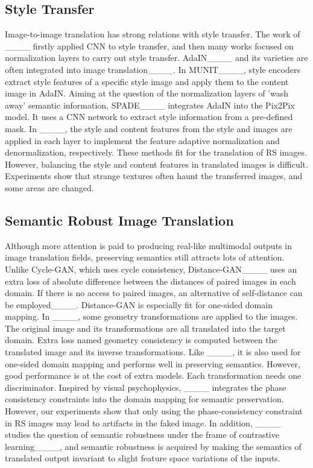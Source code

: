 \subsection{Style Transfer}\label{sec2.3}
Image-to-image translation has strong relations with style transfer. The work of ____ firstly applied CNN to style transfer, and then many works focused on normalization layers to carry out style transfer. AdaIN____ and its varieties are often integrated into image translation____. In MUNIT____, style encoders extract style features of a specific style image and apply them to the content image in AdaIN. Aiming at the question of the normalization layers of 'wash away' semantic information, SPADE____ integrates AdaIN into the Pix2Pix model. It uses a CNN network to extract style information from a pre-defined mask. In ____, the style and content features from the style and images are applied in each layer to implement the feature adaptive normalization and denormalization, respectively. These methods fit for the translation of RS images. However, balancing the style and content features in translated images is difficult. Experiments show that strange textures often haunt the transferred images, and some areas are changed.

\subsection{Semantic Robust Image Translation}\label{sec2.4}
Although more attention is paid to producing real-like multimodal outputs in image translation fields, preserving semantics still attracts lots of attention. Unlike Cycle-GAN, which uses cycle consistency, Distance-GAN____ uses an extra loss of absolute difference between the distances of paired images in each domain. If there is no access to paired images, an alternative of self-distance can be employed____. Distance-GAN is especially fit for one-sided domain mapping. In ____, some geometry transformations are applied to the images. The original image and its transformations are all translated into the target domain. Extra loss named geometry consistency is computed between the translated image and its inverse transformations. Like ____, it is also used for one-sided domain mapping and performs well in preserving semantics. However, good performance is at the cost of extra models. Each transformation needs one discriminator. Inspired by visual psychophysics, ____ integrates the phase consistency constraints into the domain mapping for semantic preservation. However, our experiments show that only using the phase-consistency constraint in RS images may lead to artifacts in the faked image. In addition, ____ studies the question of semantic robustness under the frame of contrastive learning____, and semantic robustness is acquired by making the semantics of translated output invariant to slight feature space variations of the inputs.

